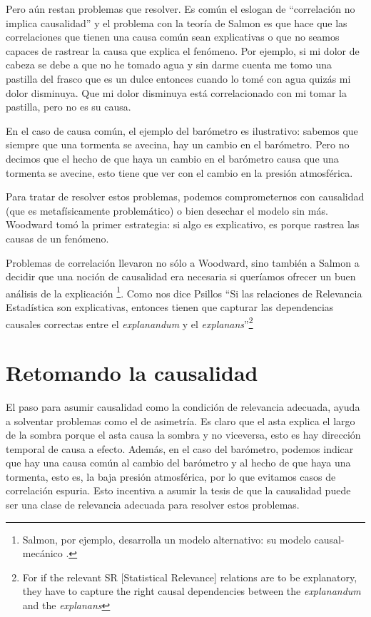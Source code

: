 Pero aún restan problemas que resolver. Es común el eslogan de ``correlación no implica causalidad'' y el problema con la teoría de Salmon es que hace que las correlaciones que tienen una causa común sean explicativas o que no seamos capaces de rastrear la causa que explica el fenómeno. Por ejemplo, si mi dolor de cabeza se debe a que no he tomado agua y sin darme cuenta me tomo una pastilla del frasco que es un dulce entonces cuando lo tomé con agua quizás mi dolor disminuya. Que mi dolor disminuya está correlacionado con mi tomar la pastilla, pero no es su causa.

En el caso de causa común, el ejemplo del barómetro es ilustrativo: sabemos que siempre que una tormenta se avecina, hay un cambio en el barómetro. Pero no decimos que el hecho de que haya un cambio en el barómetro causa que una tormenta se avecine, esto tiene que ver con el cambio en la presión atmosférica.

Para tratar de resolver estos problemas, podemos comprometernos con causalidad (que es metafísicamente problemático) o bien desechar el modelo sin más. Woodward tomó la primer estrategia: si algo es explicativo, es porque rastrea las causas de un fenómeno.

Problemas de correlación llevaron no sólo a Woodward, sino también a Salmon a decidir que una noción de causalidad era necesaria si queríamos ofrecer un buen análisis de la explicación \footnote{Salmon, por ejemplo, desarrolla un modelo alternativo: su modelo causal-mecánico \cite{Salmon1994}.}. Como nos dice Psillos ``Si las relaciones de Relevancia Estadística son explicativas, entonces tienen que capturar las dependencias causales correctas entre el \textit{explanandum} y el \textit{explanans}''\footnote{For if the relevant SR [Statistical Relevance] relations are to be explanatory, they have to capture the right causal dependencies between the \textit{explanandum} and the \textit{explanans}} \cite[p. 255]{Psillos2009}

\section{Retomando la causalidad}

\noindent El paso para asumir causalidad como la condición de relevancia adecuada, ayuda a solventar problemas como el de asimetría. Es claro que el asta explica el largo de la sombra porque el asta causa la sombra y no viceversa, esto es hay dirección temporal de causa a efecto. Además, en el caso del barómetro, podemos indicar que hay una causa común al cambio del barómetro y al hecho de que haya una tormenta, esto es, la baja presión atmosférica, por lo que evitamos casos de correlación espuria. Esto incentiva a asumir la tesis de que la causalidad puede ser una clase de relevancia adecuada para resolver estos problemas.

